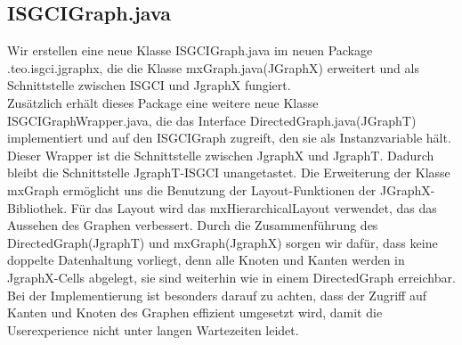 \documentclass[10pt,a4paper]{article}
\begin{document}
\subsection{ISGCIGraph.java}
Wir erstellen eine neue Klasse ISGCIGraph.java im neuen Package .teo.isgci.jgraphx, die die Klasse mxGraph.java(JGraphX) erweitert und als Schnittstelle zwischen ISGCI und JgraphX fungiert.\\
Zusätzlich erhält dieses Package eine weitere neue Klasse ISGCIGraphWrapper.java, die das Interface DirectedGraph.java(JGraphT) implementiert und auf den ISGCIGraph zugreift, den sie als Instanzvariable hält. Dieser Wrapper ist die Schnittstelle zwischen JgraphX und JgraphT. Dadurch bleibt die Schnittstelle JgraphT-ISGCI unangetastet.
Die Erweiterung der Klasse mxGraph ermöglicht uns die Benutzung der Layout-Funktionen der JGraphX-Bibliothek. Für das Layout wird das mxHierarchicalLayout verwendet, das das Aussehen des Graphen verbessert. 
 Durch die Zusammenführung des DirectedGraph(JgraphT) und mxGraph(JgraphX) sorgen wir dafür, dass keine doppelte Datenhaltung vorliegt, denn alle Knoten und Kanten werden in JgraphX-Cells abgelegt, sie sind weiterhin wie in einem DirectedGraph erreichbar. Bei der Implementierung ist besonders darauf zu achten, dass der Zugriff auf Kanten und Knoten des Graphen effizient umgesetzt wird, damit die Userexperience nicht unter langen Wartezeiten leidet.
\end{document}
